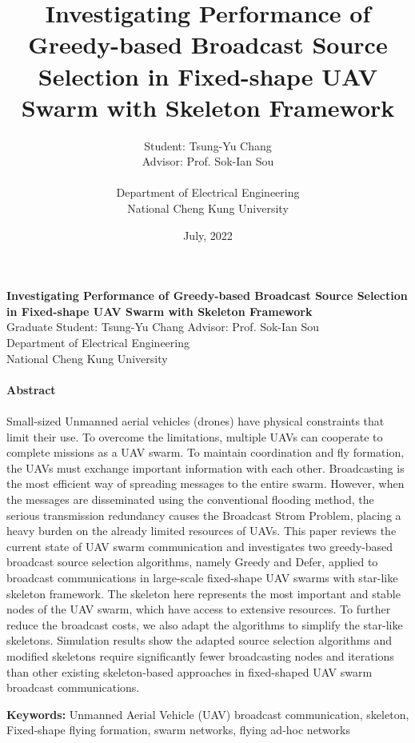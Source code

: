 \documentclass[a4paper,12pt]{report}
\title{
Investigating Performance of Greedy-based 
Broadcast Source Selection in Fixed-shape UAV Swarm 
with Skeleton Framework
\\}
\author{Student: Tsung-Yu Chang \\
Advisor: Prof. Sok-Ian Sou\\
\\
Department of Electrical Engineering  \\
National Cheng Kung University \\
}
\date{July, 2022}
\begin{document}

\maketitle

\begin{titlepage}
    \begin{center}
        {\bf\large 
Investigating Performance of Greedy-based 
Broadcast Source Selection in Fixed-shape UAV Swarm 
with Skeleton Framework
}\\
        {Graduate Student: Tsung-Yu Chang \hspace{8mm} Advisor: Prof. Sok-Ian Sou}\\
        {Department of Electrical Engineering}\\
        {National Cheng Kung University}\\
    \end{center}

    \paragraph{}
    \begin{center}
        {\bf Abstract}\\
    \end{center}
    \paragraph{}
Small-sized Unmanned aerial vehicles (drones) have physical constraints that limit their use. To overcome the limitations, multiple UAVs can cooperate to complete missions as a UAV swarm. To maintain coordination and fly formation, the UAVs must exchange important information with each other. Broadcasting is the most efficient way of spreading messages to the entire swarm. However, when the messages are disseminated using the conventional flooding method, the serious transmission redundancy causes the Broadcast Strom Problem, placing a heavy burden on the already limited resources of UAVs. This paper reviews the current state of UAV swarm communication and investigates two greedy-based broadcast source selection algorithms, namely Greedy and Defer, applied to broadcast communications in large-scale fixed-shape UAV swarms with star-like skeleton framework. The skeleton here represents the most important and stable nodes of the UAV swarm, which have access to extensive resources. To further reduce the broadcast costs, we also adapt the algorithms to simplify the star-like skeletons. Simulation results show the adapted source selection algorithms and modified skeletons require significantly fewer broadcasting nodes and iterations than other existing skeleton-based approaches in fixed-shaped UAV swarm broadcast communications.
 
    \textbf{Keywords:} {Unmanned Aerial Vehicle (UAV) broadcast communication, skeleton, Fixed-shape flying formation, swarm networks, flying ad-hoc networks}
\end{titlepage}
\end{document}
